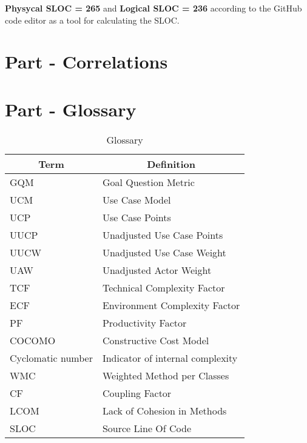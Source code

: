 \documentclass[12pt]{article}
\begin{document}
\textbf{Physycal SLOC = 265} and \textbf{Logical SLOC = 236} according to the GitHub code editor as a tool for calculating the SLOC.
\section{Part - Correlations}
\section{Part - Glossary}
\begin{table}[h]
\centering
\begin{tabular}{|l|l|}
\hline
\multicolumn{1}{|c|}{\textbf{Term}} & \multicolumn{1}{c|}{\textbf{Definition}} \\ \hline
GQM & Goal Question Metric \\ \hline
UCM & Use Case Model \\ \hline
UCP & Use Case Points \\ \hline
UUCP & Unadjusted Use Case Points \\ \hline
UUCW & Unadjusted Use Case Weight \\ \hline
UAW & Unadjusted Actor Weight \\ \hline
TCF & Technical Complexity Factor \\ \hline
ECF & Environment Complexity Factor \\ \hline
PF & Productivity Factor \\ \hline
COCOMO & Constructive Cost Model \\ \hline
Cyclomatic number & Indicator of internal complexity \\ \hline
WMC & Weighted Method per Classes \\ \hline
CF & Coupling Factor \\ \hline
LCOM & Lack of Cohesion in Methods \\ \hline
SLOC & Source Line Of Code \\ \hline
\end{tabular}
\caption{Glossary}
\end{table}
{}

\end{document}
